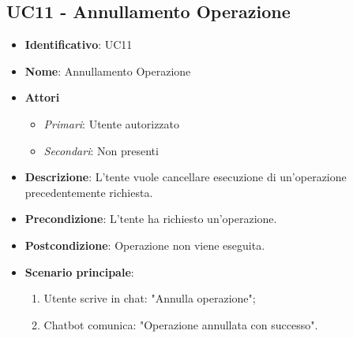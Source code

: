 \subsection{UC11 - Annullamento Operazione }
\begin{itemize}
	\item \textbf{Identificativo}: UC11
	\item \textbf{Nome}: Annullamento Operazione
	\item \textbf{Attori}
	\begin{itemize} 
		\item \textit{Primari}: Utente autorizzato
		\item \textit{Secondari}: Non presenti
	\end{itemize}
	\item \textbf{Descrizione}: L'tente vuole cancellare esecuzione di un'operazione precedentemente richiesta.
	\item \textbf{Precondizione}: L'tente ha richiesto un'operazione.
	\item \textbf{Postcondizione}: Operazione non viene eseguita.
	\item \textbf{Scenario principale}: \begin{enumerate}
		\item Utente scrive in chat: "Annulla operazione";
		\item Chatbot comunica: "Operazione annullata con successo".
	\end{enumerate}
\end{itemize}